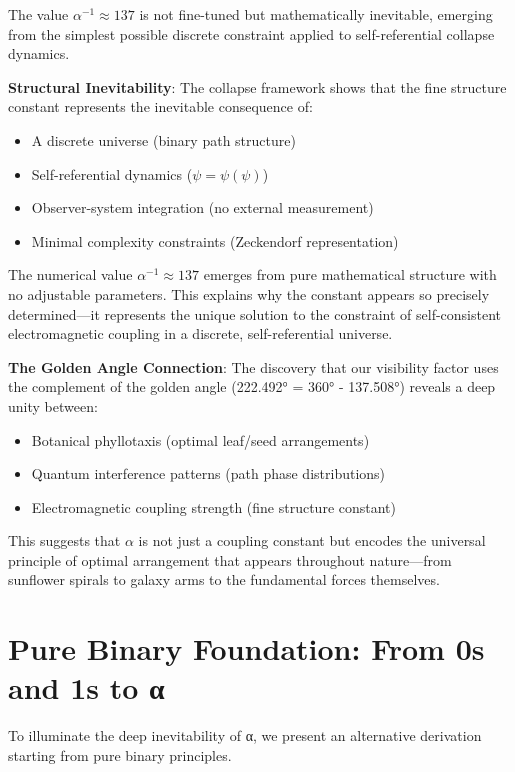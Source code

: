 \documentclass[%
 reprint,
 amsmath,amssymb,
 aps,
 prd,
 10pt,
 nofootinbib,      %
 longbibliography  %
]{revtex4-2}
\theoremstyle{definition}
\theoremstyle{remark}
\begin{document}
The value $\alpha^{-1} \approx 137$ is not fine-tuned but mathematically inevitable, emerging from the simplest possible discrete constraint applied to self-referential collapse dynamics.

\textbf{Structural Inevitability}: The collapse framework shows that the fine structure constant represents the inevitable consequence of:
\begin{itemize}
\item A discrete universe (binary path structure)
\item Self-referential dynamics ($\psi = \psi(\psi)$)
\item Observer-system integration (no external measurement)
\item Minimal complexity constraints (Zeckendorf representation)
\end{itemize}

The numerical value $\alpha^{-1} \approx 137$ emerges from pure mathematical structure with no adjustable parameters. This explains why the constant appears so precisely determined—it represents the unique solution to the constraint of self-consistent electromagnetic coupling in a discrete, self-referential universe.

\textbf{The Golden Angle Connection}: The discovery that our visibility factor uses the complement of the golden angle (222.492° = 360° - 137.508°) reveals a deep unity between:
\begin{itemize}
\item Botanical phyllotaxis (optimal leaf/seed arrangements)
\item Quantum interference patterns (path phase distributions)
\item Electromagnetic coupling strength (fine structure constant)
\end{itemize}

This suggests that $\alpha$ is not just a coupling constant but encodes the universal principle of optimal arrangement that appears throughout nature—from sunflower spirals to galaxy arms to the fundamental forces themselves.

\section{Pure Binary Foundation: From 0s and 1s to α}\label{sec:binary}

To illuminate the deep inevitability of α, we present an alternative derivation starting from pure binary principles.
\end{document}
